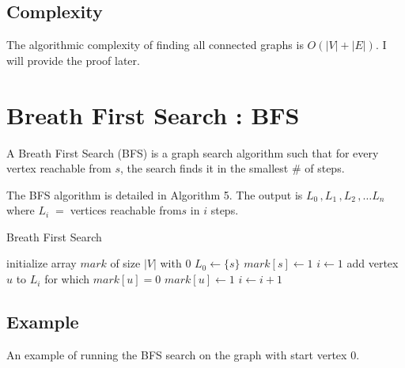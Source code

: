 \documentclass{article}
\begin{document}
\subsection{Complexity}

The algorithmic complexity of finding all connected graphs is $O(|V| + |E|)$.  I will provide the proof later.

\section{Breath First Search : BFS}

A Breath First Search (BFS) is a graph search algorithm such that for every vertex reachable from $s$, the search finds it in the smallest \# of steps.

The BFS algorithm is detailed in Algorithm 5.  The output is $L_0\,,L_1\,,L_2\,,\dots L_n$ where $L_i\;=\;$vertices reachable from$s$ in $i$ steps.

\begin{algorithm}
\caption{Breath First Search}\label{Breath first search for graph $G$}
\begin{algorithmic}[1]
	\State initialize array $mark$ of size $|V|$ with 0
	\State $L_0 \gets \{s\}$
	\State $mark[s] \gets 1$
	\State $i \gets 1$
	\Repeat
		\State add vertex $u$ to $L_i$ for which $mark[u] = 0$
		\State $mark[u] \gets 1$ 
		\State $i \gets i+1$
\EndProcedure{}
\end{algorithmic}
\end{algorithm}

\subsection{Example}

An example of running the BFS search on the graph with start vertex $0$.\\

\end{document}
